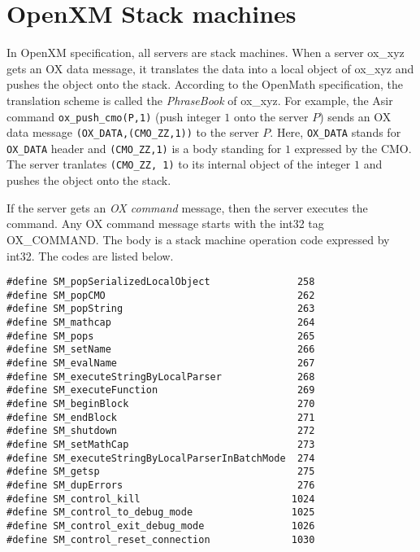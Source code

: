 
\section{OpenXM Stack machines}\label{sec:ox-stackmachines}

In OpenXM specification, all servers are stack machines.
When a server ox\_xyz gets an OX data message,
it translates the data into a local object of ox\_xyz
and pushes the object onto the stack.
According to the OpenMath specification, 
the translation scheme 
is called the {\it PhraseBook} of ox\_xyz.
For example, the Asir command {\tt ox\_push\_cmo(P,1)}
(push integer $1$ onto the server $P$)
sends an OX data message
{\tt (OX\_DATA,(CMO\_ZZ,1))} to the server $P$.
Here,
{\tt OX\_DATA} stands for {\tt OX\_DATA} header and 
{\tt (CMO\_ZZ,1)} is a body standing for $1$ expressed 
by the CMO.
The server tranlates {\tt (CMO\_ZZ, 1)} to its internal object of
the integer  $1$
and pushes the object onto the stack.

If the server gets an {\it OX command} message, then the server 
executes the command.
Any OX command message starts with the int32 tag OX\_COMMAND.
The body is a stack machine operation code expressed by int32.
The codes are listed below.
\begin{verbatim}
#define SM_popSerializedLocalObject               258
#define SM_popCMO                                 262
#define SM_popString                              263
#define SM_mathcap                                264
#define SM_pops                                   265
#define SM_setName                                266
#define SM_evalName                               267
#define SM_executeStringByLocalParser             268
#define SM_executeFunction                        269
#define SM_beginBlock                             270
#define SM_endBlock                               271
#define SM_shutdown                               272
#define SM_setMathCap                             273
#define SM_executeStringByLocalParserInBatchMode  274
#define SM_getsp                                  275
#define SM_dupErrors                              276
#define SM_control_kill                          1024
#define SM_control_to_debug_mode                 1025
#define SM_control_exit_debug_mode               1026
#define SM_control_reset_connection              1030
\end{verbatim}

